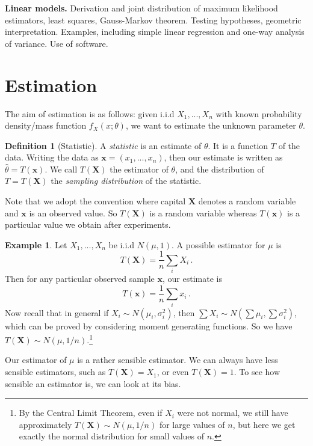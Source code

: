 \documentclass[a4paper,11pt]{article}
\theoremstyle{definition}
\newtheorem*{defn}{Definition}
\newtheorem*{ex}{Example}
\numberwithin{equation}{section}
\begin{document}
\textbf{Linear models.}
Derivation and joint distribution of maximum likelihood estimators, least squares, Gauss-Markov theorem. Testing hypotheses, geometric interpretation. Examples, including simple linear regression and one-way analysis of variance. Use of software.

\hrulefill
\clearpage

\section{Estimation}
The aim of estimation is as follows: given i.i.d $X_1,...,X_n$ with known probability density/mass function $f_X(x;\theta)$, we want to estimate the unknown parameter $\theta$.

\begin{defn}[Statistic]
A \emph{statistic} is an estimate of $\theta$. It is a function $T$ of the data. Writing the data as $\mathbf{x}=(x_1,...,x_n)$, then our estimate is written as $\hat{\theta}=T(\mathbf{x})$. We call $T(\mathbf{X})$ the estimator of $\theta$, and the distribution of $T=T(\mathbf{X})$ the \emph{sampling distribution} of the statistic.
\end{defn}

Note that we adopt the convention where capital $\mathbf{X}$ denotes a random variable and $\mathbf{x}$ is an observed value. So $T(\mathbf{X})$ is a random variable whereas $T(\mathbf{x})$ is a particular value we obtain after experiments.

\begin{ex}
Let $X_1,...,X_n$ be i.i.d $N(\mu,1)$. A possible estimator for $\mu$ is 
\[
T(\mathbf{X})=\frac{1}{n}\sum_i X_i\,.
\]
Then for any particular observed sample $\mathbf{x}$, our estimate is
\[
T(\mathbf{x})=\frac{1}{n}\sum_i x_i\,.
\]
Now recall that in general if $X_i\sim N(\mu_i,\sigma_i^2)$, then $\sum X_i\sim N(\sum\mu_i,\sum\sigma_i^2)$, which can be proved by considering moment generating functions. So we have $T(\mathbf{X})\sim N(\mu,1/n)$.\footnote{By the Central Limit Theorem, even if $X_i$ were not normal, we still have approximately $T(\mathbf{X})\sim N(\mu,1/n)$ for large values of $n$, but here we get exactly the normal distribution for small values of $n$.}
\end{ex}

Our estimator of $\mu$ is a rather sensible estimator. We can always have less sensible estimators, such as $T(\mathbf{X})=X_1$, or even $T(\mathbf{X})=1$. To see how sensible an estimator is, we can look at its bias.
\end{document}
